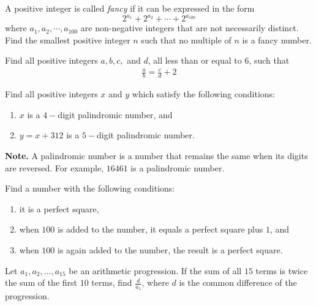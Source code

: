 \documentclass[problems.tex]{subfile}
\begin{document}
	\begin{problem}[APMO 2016]
		A positive integer is called \textit{fancy} if it can be expressed in the form $$2^{a_1}+2^{a_2}+ \cdots+ 2^{a_{100}}$$where $a_1,a_2, \cdots, a_{100}$ are non-negative integers that are not necessarily distinct. Find the smallest positive integer $n$ such that no multiple of $n$ is a fancy number. %
	\end{problem}

	\begin{problem}
		Find all positive integers $a,b,c,$ and $d$, all less than or equal to $6$, such that
		\begin{align*}
			\frac{a}{b} = \frac{c}{d} + 2
		\end{align*}
	\end{problem}

	\begin{problem}
		Find all positive integers $x$ and $y$ which satisfy the following conditions:
		\begin{enumerate}
			\item $x$ is a $4-$digit palindromic number, and
			\item $y=x+312$ is a $5-$digit palindromic number.
		\end{enumerate}
		\textbf{Note.} A palindromic number is a number that remains the same when its digits are reversed. For example, $16461$ is a palindromic number.
	\end{problem}

	\begin{problem}
		Find a number with the following conditions:
		\begin{enumerate}
			\item it is a perfect square,
			\item when $100$ is added to the number, it equals a perfect square plus $1$, and
			\item when $100$ is again added to the number, the result is a perfect square.
		\end{enumerate}
	\end{problem}

	\begin{problem}
		Let $a_1, a_2, \dots, a_{15}$ be an arithmetic progression. If the sum of all $15$ terms is twice the sum of the first $10$ terms, find $\frac{d}{a_1}$, where $d$ is the common difference of the progression.
	\end{problem}
\end{document}
